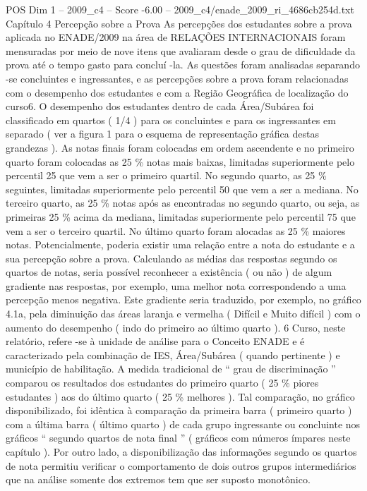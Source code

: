 \begin{textsample}{POS Dim 1 – 2009\_c4 – Score -6.00 – 2009\_c4/enade\_2009\_ri\_4686cb254d.txt}  \label{ex:f1_pos_413}
Capítulo 4 Percepção sobre a Prova As percepções dos estudantes sobre a prova aplicada no ENADE/2009 na área de RELAÇÕES INTERNACIONAIS foram mensuradas por meio de nove itens que avaliaram desde o grau de dificuldade da prova até o tempo gasto para concluí -la.
As questões foram analisadas separando -se concluintes e ingressantes, e as percepções sobre a prova foram relacionadas com o desempenho dos estudantes e com a Região Geográfica de localização do curso6.
O desempenho dos estudantes dentro de cada Área/Subárea foi classificado em quartos ( 1/4 ) para os concluintes e para os ingressantes em separado ( ver a figura 1 para o esquema de representação gráfica destas grandezas ).
As notas finais foram colocadas em ordem ascendente e no primeiro quarto foram colocadas as 25 \% notas mais baixas, limitadas superiormente pelo percentil 25 que vem a ser o primeiro quartil.
No segundo quarto, as 25 \% seguintes, limitadas superiormente pelo percentil 50 que vem a ser a mediana.
No terceiro quarto, as 25 \% notas após as encontradas no segundo quarto, ou seja, as primeiras 25 \% acima da mediana, limitadas superiormente pelo percentil 75 que vem a ser o terceiro quartil.
No último quarto foram alocadas as 25 \% maiores notas.
Potencialmente, poderia existir uma relação entre a nota do estudante e a sua percepção sobre a prova.
Calculando as médias das respostas segundo os quartos de notas, seria possível reconhecer a existência ( ou não ) de algum gradiente nas respostas, por exemplo, uma melhor nota correspondendo a uma percepção menos negativa.
Este gradiente seria traduzido, por exemplo, no gráfico 4.1a, pela diminuição das áreas laranja e vermelha ( Difícil e Muito difícil ) com o aumento do desempenho ( indo do primeiro ao último quarto ). 6 Curso, neste relatório, refere -se à unidade de análise para o Conceito ENADE e é caracterizado pela combinação de IES, Área/Subárea ( quando pertinente ) e município de habilitação.
A medida tradicional de “ grau de discriminação ” comparou os resultados dos estudantes do primeiro quarto ( 25 \% piores estudantes ) aos do último quarto ( 25 \% melhores ).
Tal comparação, no gráfico disponibilizado, foi idêntica à comparação da primeira barra ( primeiro quarto ) com a última barra ( último quarto ) de cada grupo ingressante ou concluinte nos gráficos “ segundo quartos de nota final ” ( gráficos com números ímpares neste capítulo ).
Por outro lado, a disponibilização das informações segundo os quartos de nota permitiu verificar o comportamento de dois outros grupos intermediários que na análise somente dos extremos tem que ser suposto monotônico.

\end{textsample}
